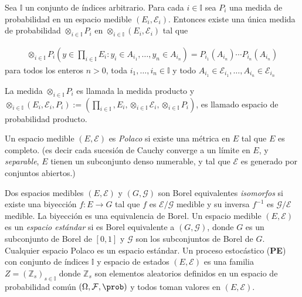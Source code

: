 \begin{Teo}
Sea $\mathbb{I}$ un conjunto de \'indices arbitrario. Para cada $i\in\mathbb{I}$ sea $P_{i}$ una medida de probabilidad en un espacio medible $\left(E_{i},\mathcal{E}_{i}\right)$. Entonces existe una \'unica medida de probabilidad $\otimes_{i\in\mathbb{I}}P_{i}$ en $\otimes_{i\in\mathbb{I}}\left(E_{i},\mathcal{E}_{i}\right)$ tal que 

\begin{eqnarray*}
\otimes_{i\in\mathbb{I}}P_{i}\left(y\in\prod_{i\in\mathbb{I}}E_{i}:y_{i}\in A_{i_{1}},\ldots,y_{n}\in A_{i_{n}}\right)=P_{i_{1}}\left(A_{i_{n}}\right)\cdots P_{i_{n}}\left(A_{i_{n}}\right)
\end{eqnarray*}
para todos los enteros $n>0$, toda $i_{1},\ldots,i_{n}\in\mathbb{I}$ y todo $A_{i_{1}}\in\mathcal{E}_{i_{1}},\ldots,A_{i_{n}}\in\mathcal{E}_{i_{n}}$
\end{Teo}

La medida $\otimes_{i\in\mathbb{I}}P_{i}$ es llamada la medida producto y $\otimes_{i\in\mathbb{I}}\left(E_{i},\mathcal{E}_{i},P_{i}\right):=\left(\prod_{i\in\mathbb{I}},E_{i},\otimes_{i\in\mathbb{I}}\mathcal{E}_{i},\otimes_{i\in\mathbb{I}}P_{i}\right)$, es llamado espacio de probabilidad producto.

\begin{Def}
Un espacio medible $\left(E,\mathcal{E}\right)$ es \textit{Polaco} si existe una m\'etrica en $E$ tal que $E$ es completo. (es decir cada sucesi\'on de Cauchy converge a un l\'imite en $E$, y \textit{separable}, $E$ tienen un subconjunto denso numerable, y tal que $\mathcal{E}$ es generado por conjuntos abiertos.)
\end{Def}

Dos espacios medibles $\left(E,\mathcal{E}\right)$ y $\left(G,\mathcal{G}\right)$ son Borel equivalentes \textit{isomorfos} si existe una biyecci\'on $f:E\rightarrow G$ tal que $f$ es $\mathcal{E}/\mathcal{G}$ medible y su inversa $f^{-1}$ es $\mathcal{G}/\mathcal{E}$ medible. La biyecci\'on es una equivalencia de Borel.  Un espacio medible  $\left(E,\mathcal{E}\right)$ es un \textit{espacio est\'andar} si es Borel equivalente a $\left(G,\mathcal{G}\right)$, donde $G$ es un subconjunto de Borel de $\left[0,1\right]$ y $\mathcal{G}$ son los subconjuntos de Borel de $G$. Cualquier espacio Polaco es un espacio est\'andar. Un proceso estoc\'astico (\textbf{PE}) con conjunto de \'indices $\mathbb{I}$ y espacio de estados $\left(E,\mathcal{E}\right)$ es una familia $Z=\left(\mathbb{Z}_{s}\right)_{s\in\mathbb{I}}$ donde $\mathbb{Z}_{s}$ son elementos aleatorios definidos en un espacio de probabilidad com\'un $\left(\Omega,\mathcal{F},\prob\right)$ y todos toman valores en $\left(E,\mathcal{E}\right)$.


